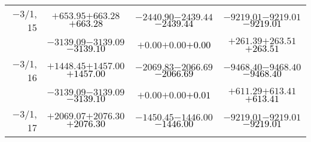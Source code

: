 \documentclass[compress]{beamer}
\begin{document}
\begin{frame}
{\begin{tabular}{r | c | c | c}
$-$3/1, 15 & $+653.95$\hspace{0.1 cm}$+663.28$\hspace{0.1 cm}\textcolor{black}{$+663.28$} & $-2440.90$\hspace{0.1 cm}$-2439.44$\hspace{0.1 cm}\textcolor{black}{$-2439.44$} & $-9219.01$\hspace{0.1 cm}$-9219.01$\hspace{0.1 cm}\textcolor{black}{$-9219.01$} \\
           & $-3139.09$\hspace{0.1 cm}$-3139.09$\hspace{0.1 cm}\textcolor{black}{$-3139.10$} & $+0.00$\hspace{0.1 cm}$+0.00$\hspace{0.1 cm}\textcolor{black}{$+0.00$} & $+261.39$\hspace{0.1 cm}$+263.51$\hspace{0.1 cm}\textcolor{black}{$+263.51$} \\
$-$3/1, 16 & $+1448.45$\hspace{0.1 cm}$+1457.00$\hspace{0.1 cm}\textcolor{black}{$+1457.00$} & $-2069.83$\hspace{0.1 cm}$-2066.69$\hspace{0.1 cm}\textcolor{black}{$-2066.69$} & $-9468.40$\hspace{0.1 cm}$-9468.40$\hspace{0.1 cm}\textcolor{black}{$-9468.40$} \\
           & $-3139.09$\hspace{0.1 cm}$-3139.09$\hspace{0.1 cm}\textcolor{black}{$-3139.10$} & $+0.00$\hspace{0.1 cm}$+0.00$\hspace{0.1 cm}\textcolor{black}{$+0.01$} & $+611.29$\hspace{0.1 cm}$+613.41$\hspace{0.1 cm}\textcolor{black}{$+613.41$} \\
$-$3/1, 17 & $+2069.07$\hspace{0.1 cm}$+2076.30$\hspace{0.1 cm}\textcolor{black}{$+2076.30$} & $-1450.45$\hspace{0.1 cm}$-1446.00$\hspace{0.1 cm}\textcolor{black}{$-1446.00$} & $-9219.01$\hspace{0.1 cm}$-9219.01$\hspace{0.1 cm}\textcolor{black}{$-9219.01$} \\

\end{tabular}}
\end{frame}
\end{document}
